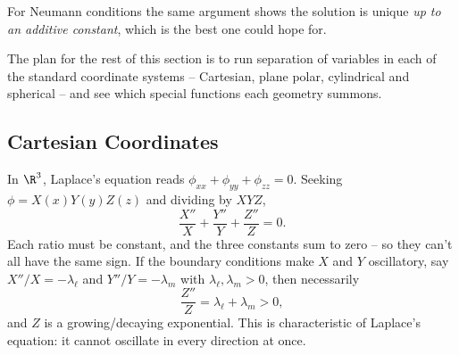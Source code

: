 For Neumann conditions the same argument shows the solution is unique \emph{up to an additive constant}, which is the best one could hope for.

The plan for the rest of this section is to run separation of variables in each of the standard coordinate systems -- Cartesian, plane polar, cylindrical and spherical -- and see which special functions each geometry summons.

\subsection{Cartesian Coordinates}

In $\R^3$, Laplace's equation reads $\phi_{xx} + \phi_{yy} + \phi_{zz} = 0$. Seeking $\phi = X(x) Y(y) Z(z)$ and dividing by $XYZ$,
$$
\frac{X''}{X} + \frac{Y''}{Y} + \frac{Z''}{Z} = 0.
$$
Each ratio must be constant, and the three constants sum to zero -- so they can't all have the same sign. If the boundary conditions make $X$ and $Y$ oscillatory, say $X''/X = -\lambda_\ell$ and $Y''/Y = -\lambda_m$ with $\lambda_\ell, \lambda_m > 0$, then necessarily
$$
\frac{Z''}{Z} = \lambda_\ell + \lambda_m > 0,
$$
and $Z$ is a growing/decaying exponential. This is characteristic of Laplace's equation: it cannot oscillate in every direction at once.

